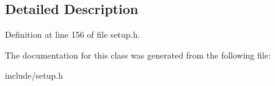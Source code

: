 \subsection{Detailed Description}


Definition at line 156 of file setup.\-h.



The documentation for this class was generated from the following file\-:\begin{DoxyCompactItemize}
\item 
include/setup.\-h\end{DoxyCompactItemize}
